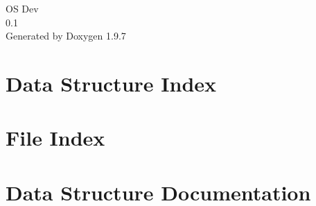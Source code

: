 \documentclass[twoside]{book}
\newcommand{\+}{\discretionary{\mbox{\scriptsize$\hookleftarrow$}}{}{}}
\newcommand{\clearemptydoublepage}{%
    \newpage{\pagestyle{empty}\cleardoublepage}%
  }
\begin{document}
  \raggedbottom
    \hypersetup{pageanchor=false,
                bookmarksnumbered=true,
                pdfencoding=unicode
               }
  \begin{titlepage}
  \vspace*{7cm}
  \begin{center}%
  {\Large OS Dev}\\
  [1ex]\large 0.\+1 \\
  \vspace*{1cm}
  {\large Generated by Doxygen 1.9.7}\\
  \end{center}
  \end{titlepage}
  \clearemptydoublepage
  \tableofcontents
  \clearemptydoublepage
  \hypersetup{pageanchor=true}

\chapter{Data Structure Index}

\chapter{File Index}

\chapter{Data Structure Documentation}

















\end{document}
